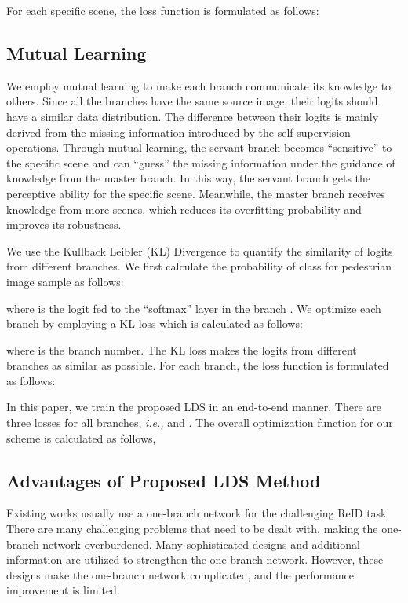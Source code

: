 \documentclass[a4paper]{cas-dc}
\begin{document}
For each specific scene, the loss function  is formulated as follows: 


\subsection{Mutual Learning} \label{mutuallearning}
We employ mutual learning to make each branch communicate its knowledge to others. Since all the branches have the same source image, their logits should have a similar data distribution. The difference between their logits is mainly derived from the missing information introduced by the self-supervision operations. Through mutual learning, the servant branch becomes ``sensitive'' to the specific scene and can ``guess'' the missing information under the guidance of knowledge from the master branch. In this way, the servant branch gets the perceptive ability for the specific scene. Meanwhile, the master branch receives knowledge from more scenes, which reduces its overfitting probability and improves its robustness.

We use the Kullback Leibler (KL) Divergence to quantify the similarity of logits from different branches. We first calculate the probability  of class  for pedestrian image sample  as follows:
 \label{probability}

\noindent where  is the logit fed to the ``softmax” layer in the branch . We optimize each branch by employing a KL loss which is calculated as follows:
 \label{KL}

\noindent where  is the branch number. The KL loss  makes the logits from different branches as similar as possible. For each branch, the loss function  is formulated as follows: 


In this paper, we train the proposed LDS in an end-to-end manner. There are three losses for all branches, \textit{i.e.,}  and . The overall optimization function for our scheme is calculated as follows,


\subsection{Advantages of Proposed LDS Method}
Existing works usually use a one-branch network for the challenging ReID task. There are many challenging problems that need to be dealt with, making the one-branch network overburdened. Many sophisticated designs and additional information are utilized to strengthen the one-branch network. However, these designs make the one-branch network complicated, and the performance improvement is limited.
\end{document}
